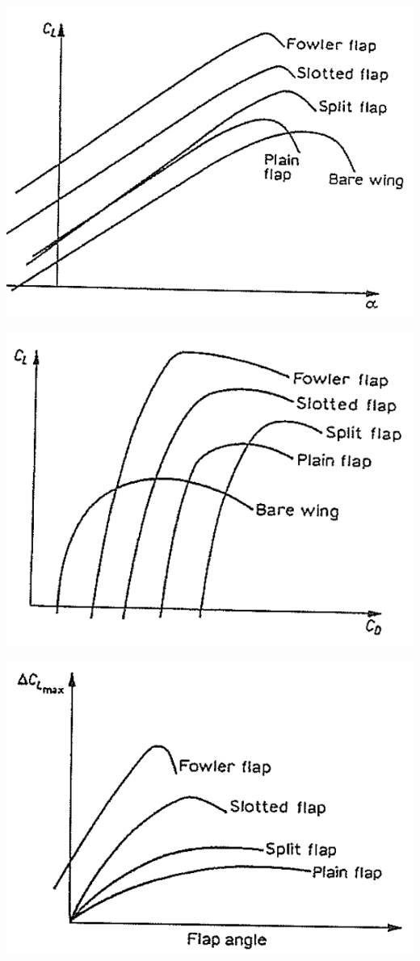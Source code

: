 \documentclass[british,french,11pt, a4paper, openany]{article}
\begin{document}
\begin{center}
	\begin{minipage}{0.25\textwidth}
		\includegraphics[scale=0.15]{ch5/5}
	\end{minipage}
	\begin{minipage}{0.25\textwidth}
		\includegraphics[scale=0.15]{ch5/6}
	\end{minipage}
	\begin{minipage}{0.3\textwidth}
		\includegraphics[scale=0.2]{ch5/7}

\end{minipage}
\end{center}
\end{document}

